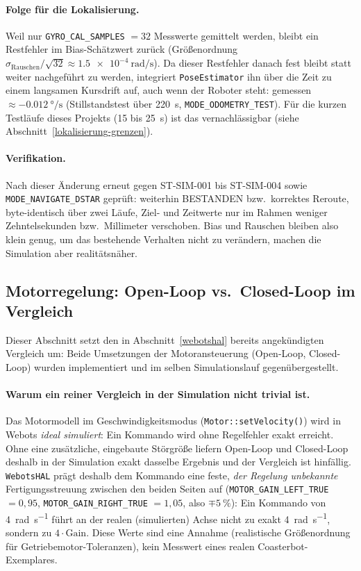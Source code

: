 \documentclass[
  a4paper,
  12pt,
  DIV=12,        %
  parskip=half,  %
  headings=small %
]{scrartcl}
\theoremstyle{definition}
\theoremstyle{definition}
\begin{document}
\paragraph{Folge für die Lokalisierung.} Weil nur \texttt{GYRO\_CAL\_SAMPLES}
$= 32$ Messwerte gemittelt werden, bleibt ein Restfehler im
Bias-Schätzwert zurück (Größenordnung
$\sigma_\mathrm{Rauschen} / \sqrt{32} \approx \SI{1.5e-4}{\radian\per\second}$).
Da dieser Restfehler danach fest bleibt statt weiter nachgeführt zu
werden, integriert \texttt{PoseEstimator} ihn über die Zeit zu einem
langsamen Kursdrift auf, auch wenn der Roboter steht: gemessen
$\approx \SI{-0.012}{\degree\per\second}$ (Stillstandstest über
\SI{220}{\second}, \texttt{MODE\_ODOMETRY\_TEST}). Für die kurzen
Testläufe dieses Projekts (\SI{15}{} bis \SI{25}{\second}) ist das
vernachlässigbar (siehe Abschnitt~\ref{lokalisierung-grenzen}).

\paragraph{Verifikation.} Nach dieser Änderung erneut gegen
ST-SIM-001 bis ST-SIM-004 sowie \texttt{MODE\_NAVIGATE\_DSTAR} geprüft:
weiterhin BESTANDEN bzw.\ korrektes Reroute, byte-identisch über zwei
Läufe, Ziel- und Zeitwerte nur im Rahmen weniger Zehntelsekunden bzw.\
Millimeter verschoben. Bias und Rauschen bleiben also klein genug, um das
bestehende Verhalten nicht zu verändern, machen die Simulation aber
realitätsnäher.

\subsection{Motorregelung: Open-Loop vs.\ Closed-Loop im
Vergleich}\label{motor-control-vergleich}

Dieser Abschnitt setzt den in Abschnitt~\ref{webotshal} bereits
angekündigten Vergleich um: Beide Umsetzungen der Motoransteuerung (Open-Loop,
Closed-Loop) wurden implementiert und im selben Simulationslauf gegenübergestellt.

\paragraph{Warum ein reiner Vergleich in der Simulation nicht trivial ist.}
Das Motormodell im Geschwindigkeitsmodus (\texttt{Motor::setVelocity()})
wird in Webots \emph{ideal simuliert}: Ein Kommando wird ohne Regelfehler exakt erreicht.
Ohne eine zusätzliche, eingebaute
Störgröße liefern Open-Loop und Closed-Loop deshalb in der Simulation exakt
dasselbe Ergebnis und der Vergleich ist hinfällig.
\texttt{WebotsHAL} prägt deshalb dem Kommando eine feste, \emph{der
Regelung unbekannte} Fertigungsstreuung zwischen den beiden Seiten auf
(\texttt{MOTOR\_GAIN\_LEFT\_TRUE} $= 0{,}95$, \texttt{MOTOR\_GAIN\_RIGHT\_TRUE}
$= 1{,}05$, also $\mp\SI{5}{\percent}$): Ein Kommando von
\SI{4}{\radian\per\second} führt an der realen (simulierten) Achse nicht zu
exakt \SI{4}{\radian\per\second}, sondern zu $4 \cdot \text{Gain}$. Diese
Werte sind eine Annahme (realistische Größenordnung für
Getriebemotor-Toleranzen), kein Messwert eines realen Coasterbot-Exemplares.
\end{document}
